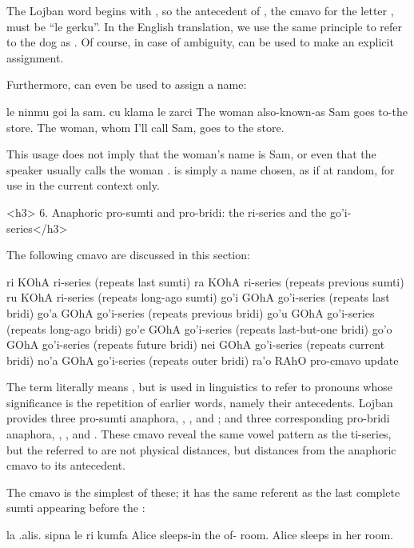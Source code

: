 The Lojban word  begins with , so the antecedent
    of , the cmavo for the letter , must be ``le
    gerku''. In the English translation, we use the same principle
    to refer to the dog as . Of course, in case of ambiguity,
     can be used to make an explicit assignment. 

Furthermore,  can even be used to assign a name:
\begin{example}
le ninmu goi la sam. cu klama le zarci\n
The woman also-known-as Sam goes to-the store.\n
The woman, whom I'll call Sam, goes to the store.
\end{example}

This usage does not imply that the woman's name is Sam, or
    even that the speaker usually calls the woman . 
    is simply a name chosen, as if at random, for use in the
    current context only.

<h3>
6. Anaphoric pro-sumti and pro-bridi: the ri-series and the
    go'i-series</h3>

The following cmavo are discussed in this section:

   ri  KOhA    ri-series   (repeats last sumti)
    ra  KOhA    ri-series   (repeats previous sumti)
    ru  KOhA    ri-series   (repeats long-ago sumti)
    go'i    GOhA    go'i-series (repeats last bridi)
    go'a    GOhA    go'i-series (repeats previous bridi)
    go'u    GOhA    go'i-series (repeats long-ago bridi)
    go'e    GOhA    go'i-series (repeats last-but-one bridi)
    go'o    GOhA    go'i-series (repeats future bridi)
    nei GOhA    go'i-series (repeats current bridi)
    no'a    GOhA    go'i-series (repeats outer bridi)
    ra'o    RAhO            pro-cmavo update

The term  literally means , but is
    used in linguistics to refer to pronouns whose significance is
    the repetition of earlier words, namely their antecedents.
    Lojban provides three pro-sumti anaphora, , , and
    ; and three corresponding pro-bridi anaphora, ,
    , and . These cmavo reveal the same vowel
    pattern as the ti-series, but the  referred to are
    not physical distances, but distances from the anaphoric cmavo
    to its antecedent. 

The cmavo  is the simplest of these; it has the same
    referent as the last complete sumti appearing before the
    :
\begin{example}
la .alis. sipna le ri kumfa\n
Alice sleeps-in the of- room.\n
Alice sleeps in her room.
\end{example}


